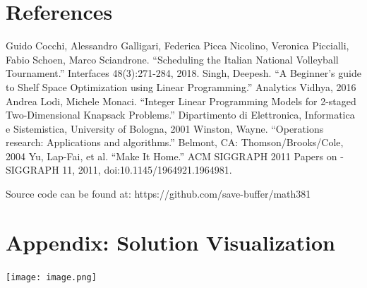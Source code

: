 \documentclass[10pt]{article}
\theoremstyle{named}
\begin{document}
\section{References}
\begin{thebibliography}{9}
 Guido Cocchi, Alessandro Galligari, Federica Picca Nicolino,
  Veronica Piccialli, Fabio Schoen, Marco Sciandrone.
  “Scheduling the Italian National Volleyball Tournament.” Interfaces 48(3):271-284, 2018. 
 Singh, Deepesh. “A Beginner’s guide to Shelf Space Optimization using
  Linear Programming.” Analytics Vidhya, 2016
 Andrea Lodi, Michele Monaci. “Integer Linear Programming Models for
  2-staged Two-Dimensional Knapsack Problems.” Dipartimento di Elettronica,
  Informatica e Sistemistica, University of Bologna, 2001
 Winston, Wayne. “Operations research:
  Applications and algorithms.” Belmont, CA: Thomson/Brooks/Cole, 2004
  Yu, Lap-Fai, et al. “Make It Home.” ACM SIGGRAPH 2011 Papers
  on - SIGGRAPH 11, 2011, doi:10.1145/1964921.1964981.  
\end{thebibliography}
Source code can be found at: https://github.com/save-buffer/math381

\pagebreak
{}
\section{Appendix: Solution Visualization}
\texttt{[image: image.png]}
\end{document}
